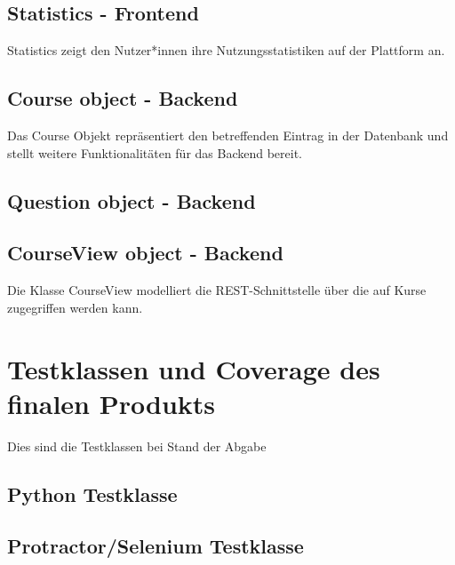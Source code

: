 \documentclass[accentcolor=tud0b,12pt,paper=a4]{tudreport}
\begin{document}
	

	\section*{Statistics - Frontend}
	Statistics zeigt den Nutzer*innen ihre Nutzungsstatistiken auf der Plattform an. 

	

	\section*{Course object - Backend}
	Das Course Objekt repräsentiert den betreffenden Eintrag in der Datenbank und stellt weitere Funktionalitäten für das Backend bereit.

	

	\section*{Question object - Backend} 

	

	\section*{CourseView object - Backend}
	Die Klasse CourseView modelliert die REST-Schnittstelle über die auf Kurse zugegriffen werden kann.

	

\chapter{Testklassen und Coverage des finalen Produkts}

	Dies sind die Testklassen bei Stand der Abgabe

	\section{Python Testklasse}
	

	\section{Protractor/Selenium Testklasse}
	
\end{document}
